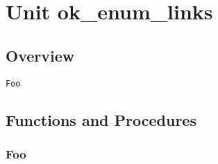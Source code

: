 \documentclass{report}
\newif\ifpdf
\begin{document}
\label{toc}\tableofcontents
\newpage
\newlength{\tmplength}
\chapter{Unit ok{\_}enum{\_}links}
\label{ok_enum_links}
\section{Overview}
\begin{description}
\item[\texttt{Foo}]
\end{description}
\section{Functions and Procedures}
\ifpdf
\subsection*{\large{\textbf{Foo}}\normalsize\hspace{1ex}\hrulefill}
\else
\end{document}
